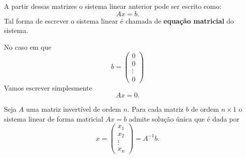 A partir dessas matrizes o sistema linear anterior pode ser escrito como:
\[
    Ax = b.
\]
Tal forma de escrever o sistema linear é chamada de \textbf{equação matricial} do sistema.

No caso em que
\[
    b = \begin{pmatrix}
        0\\0\\\vdots\\0
    \end{pmatrix}
\]
Vamos escrever simplesmente
\[
    Ax = 0.
\]

\begin{teorema}
    Seja $A$ uma matriz invertível de ordem $n$. Para cada matriz $b$ de ordem $n\times 1$ o sistema linear de forma matricial $Ax = b$ admite solução única que é dada por
    \[
        x = \begin{pmatrix}
            x_1 \\ x_2 \\ \vdots \\ x_n
        \end{pmatrix} = A^{-1}b.
    \]
\end{teorema}

